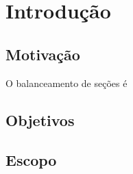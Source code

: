 
\chapter{Introdução}

\section{Motivação}

O balanceamento de seções é 


\section{Objetivos}

\section{Escopo}


